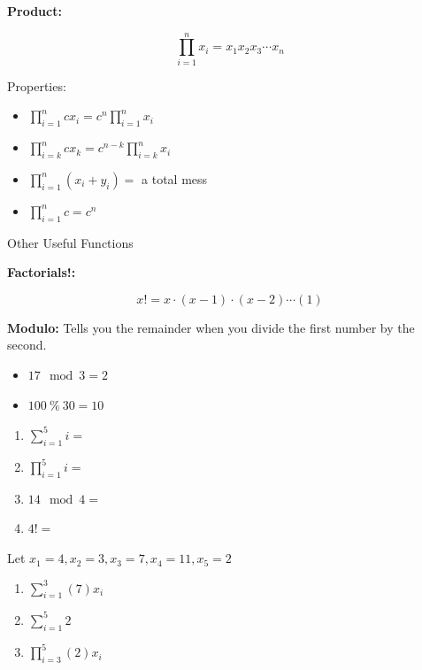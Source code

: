 \documentclass[]{book}
\providecommand{\tightlist}{%
  \setlength{\itemsep}{0pt}\setlength{\parskip}{0pt}}
\theoremstyle{definition}
\theoremstyle{definition}
\theoremstyle{definition}
\theoremstyle{remark}
\let\BeginKnitrBlock\begin \let\EndKnitrBlock\end
\begin{document}
\textbf{Product:}

\[\prod\limits_{i=1}^n x_i = x_1 x_2 x_3 \cdots x_n\]

Properties:

\begin{itemize}
\tightlist
\item
  \(\prod\limits_{i=1}^n c x_i = c^n \prod\limits_{i=1}^n x_i\)
\item
  \(\prod\limits_{i=k}^n c x_k = c^{n-k} \prod\limits_{i=k}^n x_i\)
\item
  \(\prod\limits_{i=1}^n (x_i + y_i) =\) a total mess
\item
  \(\prod\limits_{i=1}^n c = c^n\)
\end{itemize}

Other Useful Functions

\textbf{Factorials!:}

\[x! = x\cdot (x-1) \cdot (x-2) \cdots (1)\]

\textbf{Modulo:} Tells you the remainder when you divide the first
number by the second.

\begin{itemize}
\tightlist
\item
  \(17 \mod 3 = 2\)
\item
  \(100 \ \% \ 30 = 10\)
\end{itemize}

\BeginKnitrBlock{example}[Operators]
\protect\hypertarget{exm:operators}{}{\label{exm:operators}
{} }

\begin{enumerate}
\def\labelenumi{\arabic{enumi}.}
\item
  \(\sum\limits_{i=1}^{5} i =\)
\item
  \(\prod\limits_{i=1}^{5} i =\)
\item
  \(14 \mod 4 =\)
\item
  \(4! =\)
\end{enumerate}
\EndKnitrBlock{example}

\BeginKnitrBlock{exercise}[Operators]
\protect\hypertarget{exr:operators1}{}{\label{exr:operators1}
{} }Let
\(x_1 = 4, x_2 = 3, x_3 = 7, x_4 = 11, x_5 = 2\)

\begin{enumerate}
\def\labelenumi{\arabic{enumi}.}
\item
  \(\sum\limits_{i=1}^{3} (7)x_i\)
\item
  \(\sum\limits_{i=1}^{5} 2\)
\item
  \(\prod\limits_{i=3}^{5} (2)x_i\)
\end{enumerate}
\EndKnitrBlock{exercise}
\end{document}

